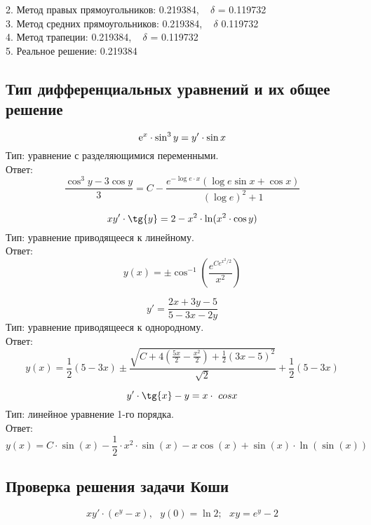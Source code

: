 \documentclass[14pt, titlepage, fleqn]{extarticle}
\begin{document}
2. Метод правых прямоугольников: 0.219384, ~ $\delta$ = 0.119732\\

3. Метод средних прямоугольников: 0.219384, ~ $\delta$ 0.119732\\

4. Метод трапеции: 0.219384, ~ $\delta$ = 0.119732\\

5. Реальное решение: 0.219384

\newpage
	\subsection*{Тип дифференциальных уравнений и их общее решение}

	$${\rm e}^{x} \cdot \sin^{3}{y} = y'\cdot \sin{x}$$ 
	Тип: уравнение с разделяющимися переменными.\\	
	Ответ: 
	\begin{equation}
		{\frac{\cos^3{y} - 3 \cos{y}}{3} = C - \frac{e^{-\log{e \cdot x}}(\log{e} \sin{x} + \cos{x})}{(\log{e})^2 + 1}}
	\end{equation}

	$$xy' \cdot \tg{y} = 2 - x^2 \cdot \ln(x^2 \cdot \cos{y})$$
	Тип: уравнение приводящееся к линейному.\\
	Ответ:
	\begin{equation}
		{y(x) = \pm \cos^{-1}{\left( \frac{e^{Ce^{x^2/2}}}{x^2} \right)}}
	\end{equation}

	$$y' = \frac{2x + 3y - 5}{5 - 3x - 2y}$$ 
	Тип: уравнение приводящееся к однородному.\\
	Ответ:
	\begin{equation}
		{y(x)= \frac{1}{2}(5 - 3x) \pm \frac{\sqrt{C + 4 (\frac {5x}{2} - \frac{x^2}{2}) + \frac{1}{2}(3x-5)^2}}{\sqrt{2}} + \frac{1}{2}(5 - 3x)}
	\end{equation}
	
	$$y' \cdot \tg{x} - y = x \cdot \ cos{x}$$ 
	Тип: линейное уравнение 1-го порядка.\\
	Ответ:
	\begin{equation}
		{y(x) = C \cdot \sin(x) - \frac{1}{2} \cdot x^2 \cdot \sin(x) - x\cos(x) + \sin(x) \cdot \ln(\sin(x))}
	\end{equation}

	\newpage
	\subsection*{Проверка решения задачи Коши}
		$$xy' \cdot (e^{y} - x), ~~~y(0) = \ln{2}; ~~~xy = e^y-2$$
		
\end{document}
